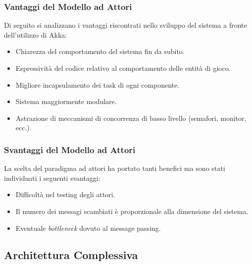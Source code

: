 \subsubsection{Vantaggi del Modello ad Attori}
Di seguito si analizzano i vantaggi riscontrati nello sviluppo del sistema a fronte dell'utilizzo di Akka:
\begin{itemize}
    \item Chiarezza del comportamento del sistema fin da subito.
    \item Espressività del codice relativo al comportamento delle entità di gioco.
    \item Migliore incapsulamento dei task di ogni componente.
    \item Sistema maggiormente modulare.
    \item Astrazione di meccanismi di concorrenza di basso livello (semafori, monitor, ecc.).
\end{itemize}

\subsubsection{Svantaggi del Modello ad Attori}
La scelta del paradigma ad attori ha portato tanti benefici ma sono stati individuati i seguenti svantaggi:
\begin{itemize}
    \item Difficoltà nel testing degli attori.
    \item Il numero dei messagi scambiati è proporzionale alla dimensione del sistema.
    \item Eventuale \textit{bottleneck} dovuto al message passing.
\end{itemize}

\subsection{Architettura Complessiva}
